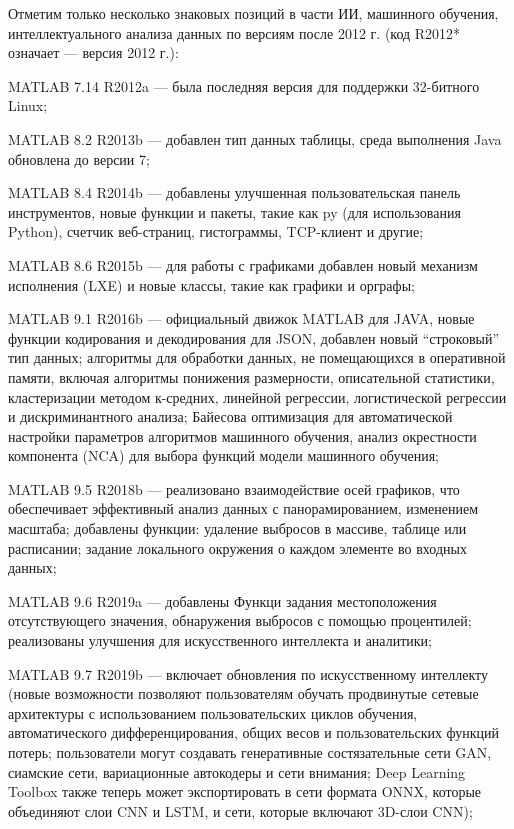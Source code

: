 Отметим только несколько знаковых позиций в части ИИ, машинного обучения, интеллектуального анализа данных по версиям после 2012 г. (код R2012* означает --- версия 2012 г.):
\begin{textitemize}
	\item MATLAB 7.14 R2012a --- была последняя версия для поддержки 32-битного Linux;
	\item MATLAB 8.2 R2013b --- добавлен тип данных таблицы, среда выполнения Java обновлена до версии 7;
	\item MATLAB 8.4 R2014b --- добавлены улучшенная пользовательская панель инструментов, новые функции и пакеты, такие как py (для использования Python), счетчик веб-страниц, гистограммы, TCP-клиент и другие;
	\item MATLAB 8.6 R2015b --- для работы с графиками добавлен новый механизм исполнения (LXE) и новые классы, такие как графики и орграфы;
	\item MATLAB 9.1 R2016b --- официальный движок MATLAB для JAVA, новые функции кодирования и декодирования для JSON, добавлен новый ``строковый'' тип данных; алгоритмы для обработки данных, не помещающихся в оперативной памяти, включая алгоритмы понижения размерности, описательной статистики, кластеризации методом к-средних, линейной регрессии, логистической регрессии и дискриминантного анализа; Байесова оптимизация для автоматической настройки параметров алгоритмов машинного обучения, анализ окрестности компонента (NCA) для выбора функций модели машинного обучения;
	\item MATLAB 9.5 R2018b --- реализовано взаимодействие осей графиков, что обеспечивает эффективный анализ данных с панорамированием, изменением масштаба; добавлены функции: удаление выбросов в массиве, таблице или расписании; задание локального окружения о каждом элементе во входных данных; 
	\item MATLAB 9.6 R2019a --- добавлены Функци задания местоположения отсутствующего значения, обнаружения выбросов с помощью процентилей; реализованы улучшения для искусственного интеллекта и аналитики; 
	\item MATLAB 9.7 R2019b --- включает обновления по искусственному интеллекту (новые возможности позволяют пользователям обучать продвинутые сетевые архитектуры с использованием пользовательских циклов обучения, автоматического дифференцирования, общих весов и пользовательских функций потерь; пользователи могут создавать генеративные состязательные сети GAN, сиамские сети, вариационные автокодеры и сети внимания; Deep Learning Toolbox также теперь может экспортировать в сети формата ONNX, которые объединяют слои CNN и LSTM, и сети, которые включают 3D-слои CNN); 

\end{textitemize}
